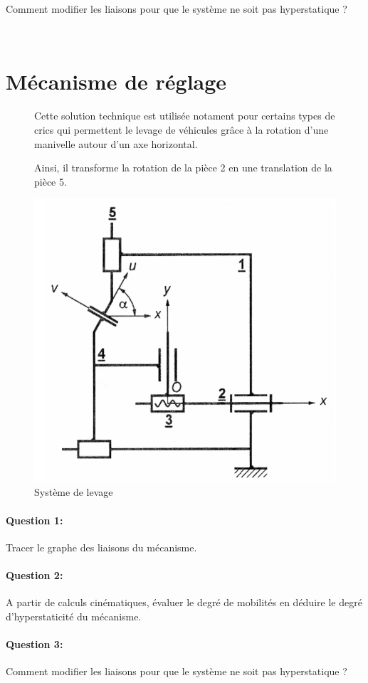 Comment modifier les liaisons pour que le système ne soit pas hyperstatique ?

\newpage

~\

\cleardoublepage

\section{Mécanisme de réglage}

\begin{figure}[htbp]
\begin{minipage}[c]{.45\linewidth}
Cette solution technique est utilisée notament pour certains types de crics qui permettent le levage de véhicules grâce à la rotation d'une manivelle autour d'un axe horizontal.

Ainsi, il transforme la rotation de la pièce 2 en une translation de la pièce 5.
\end{minipage}
\hfill
\begin{minipage}[c]{.50\linewidth}
\begin{center}
\includegraphics[width=0.8\linewidth]{img/levage.png}
\caption{Système de levage}
\label{fig:image9}
\end{center}
\end{minipage}
\end{figure}

\paragraph{Question 1:}

Tracer le graphe des liaisons du mécanisme.

\paragraph{Question 2:}

A partir de calculs cinématiques, évaluer le degré de mobilités en déduire le degré d'hyperstaticité du mécanisme.

\paragraph{Question 3:}

Comment modifier les liaisons pour que le système ne soit pas hyperstatique ?


